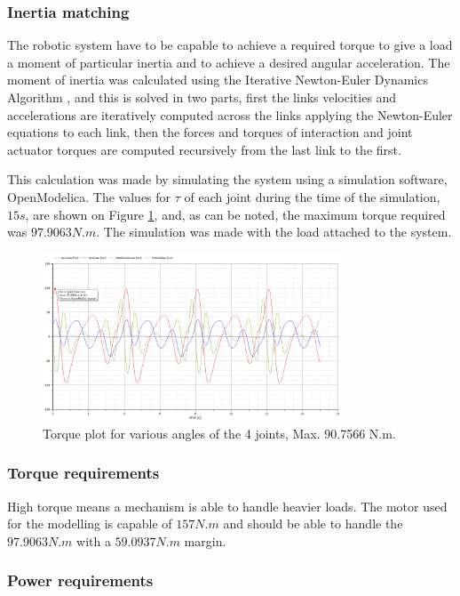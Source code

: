 \documentclass[transmag]{IEEEtran}
\begin{document}
\subsubsection{Inertia matching}

The robotic system have to be capable to achieve a required torque to give a load a moment of particular inertia and to achieve a desired angular acceleration. The moment of inertia was calculated using the Iterative Newton-Euler Dynamics Algorithm \cite{ref7}, and this is solved in two parts, first the links velocities and accelerations are iteratively computed across the links applying the Newton-Euler equations to each link, then the forces and torques of interaction and joint actuator torques are computed recursively from the last link to the first.

This calculation was made by simulating the system using a simulation software, OpenModelica. The values for $\tau$ of each joint during the time of the simulation, $15 s$, are shown on Figure \ref{TauJoints}, and, as can be noted, the maximum torque required was $97.9063 N.m$. The simulation was made with the load attached to the system.

\begin{figure}
\centerline{\includegraphics[width=3.5in]{./images/TausJoints}}
\caption{Torque plot for various angles of the 4 joints, Max. 90.7566 N.m.\label{TauJoints}}
\end{figure}

\subsubsection{Torque requirements}

High torque means a mechanism is able to handle heavier loads. The motor used for the modelling is capable of $157 N.m$ and should be able to handle the $97.9063 N.m$ with a $59.0937 N.m$ margin.

\subsubsection{Power requirements}
\end{document}
